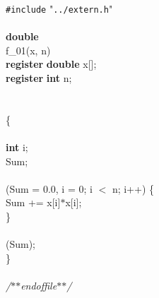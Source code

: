 \begin{flushleft}
{\tt \#include} "{\tt ../extern.h}"\mbox{}\\
\mbox{}\\
{\bf double}\mbox{}\\
f\_01(x, n)\mbox{}\\
{\bf register} {\bf double}		x[];\mbox{}\\
{\bf register} {\bf int}		n;\mbox{}\\
\mbox{}\\
\mbox{}\\
\{\mbox{}\\
\hspace*{1\indentation}\mbox{}\\
\hspace*{8\indentation}{\bf register} {\bf int} 	i;\mbox{}\\
\hspace*{8\indentation}{\bf double} 		Sum;\mbox{}\\
\mbox{}\\
\hspace*{8\indentation}{\bf for} (Sum = 0.0, i = 0; i $<$ n; i++) \{\mbox{}\\
\hspace*{16\indentation}Sum += x[i]$\ast$x[i];	\mbox{}\\
\hspace*{8\indentation}\}\mbox{}\\
\mbox{}\\
\hspace*{8\indentation}{\bf return} (Sum);\mbox{}\\
\}\mbox{}\\
\mbox{}\\
{\it /$\ast$$\ast$\hspace*{1\indentation}end\hspace*{1\indentation}of\hspace*{1\indentation}file\hspace*{1\indentation}$\ast$$\ast$/}\mbox{}\\
\end{flushleft}

